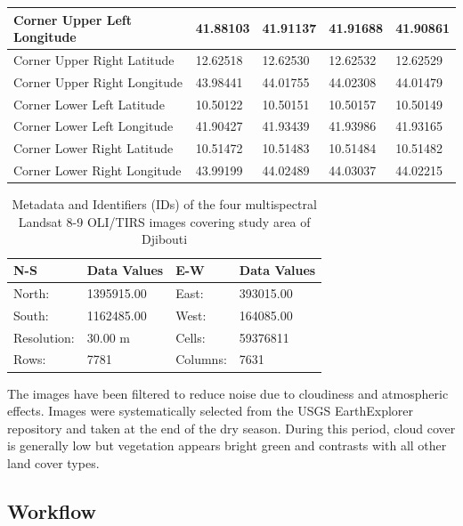 \documentclass[jimaging,article,submit,pdftex,moreauthors]{Definitions/mdpi}
\begin{document}
\begin{table}[!ht]
\begin{tabular}{ l | l | l | l | l }
        Corner Upper Left Longitude & 41.88103 & 41.91137 & 41.91688 & 41.90861 \\ \hline
        Corner Upper Right Latitude & 12.62518 & 12.62530 & 12.62532 & 12.62529 \\ \hline
        Corner Upper Right Longitude & 43.98441 & 44.01755 & 44.02308 & 44.01479 \\ \hline
        Corner Lower Left Latitude & 10.50122 & 10.50151 & 10.50157 & 10.50149 \\ \hline
        Corner Lower Left Longitude & 41.90427 & 41.93439 & 41.93986 & 41.93165 \\ \hline
        Corner Lower Right Latitude & 10.51472 & 10.51483 & 10.51484 & 10.51482 \\ \hline
        Corner Lower Right Longitude & 43.99199 & 44.02489 & 44.03037 & 44.02215 \\ \hline
    \end{tabular}
\end{table}

\begin{table}[H]
\caption{Metadata and Identifiers (IDs) of the four multispectral Landsat 8-9 OLI/TIRS images covering study area of Djibouti}\label{tab03}
\setlength\tabcolsep{0pt}
\begin{tabularx}{\textwidth}{ X X X X}
\textbf{N-S} & \textbf{Data Values} & \textbf{E-W} & \textbf{Data Values}\\
\midrule
	North: & 1395915.00 &  East: & 393015.00 \\
	South: &  1162485.00 &  West: & 164085.00 \\
	Resolution: &  30.00 m & Cells: & 59376811 \\
	Rows: & 7781 & Columns: & 7631 \\
\bottomrule
\end{tabularx}
\end{table}
 
 The images have been filtered to reduce noise due to cloudiness and atmospheric effects. Images were systematically selected from the USGS EarthExplorer repository and taken at the end of the dry season. During this period, cloud cover is generally low but vegetation appears bright green and contrasts with all other land cover types. 

\subsection{Workflow}
\end{document}
